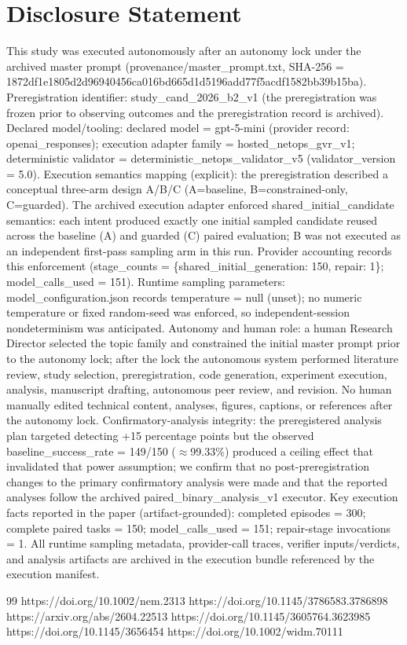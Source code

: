 \documentclass[conference]{IEEEtran}
\begin{document}
\section*{Disclosure Statement}
This study was executed autonomously after an autonomy lock under the archived master prompt (provenance/master\_prompt.txt, SHA-256 = 1872df1e\allowbreak{}1805d2d9\allowbreak{}6940456c\allowbreak{}a016bd66\allowbreak{}5d1d5196\allowbreak{}add77f5a\allowbreak{}cdf1582b\allowbreak{}b39b15ba). Preregistration identifier: study\_cand\_2026\_b2\_v1 (the preregistration was frozen prior to observing outcomes and the preregistration record is archived). Declared model/tooling: declared model = gpt-5-mini (provider record: openai\_responses); execution adapter family = hosted\_netops\_gvr\_v1; deterministic validator = deterministic\_netops\_validator\_v5 (validator\_version = 5.0). Execution semantics mapping (explicit): the preregistration described a conceptual three-arm design A/B/C (A=baseline, B=constrained-only, C=guarded). The archived execution adapter enforced shared\_initial\_candidate semantics: each intent produced exactly one initial sampled candidate reused across the baseline (A) and guarded (C) paired evaluation; B was not executed as an independent first-pass sampling arm in this run. Provider accounting records this enforcement (stage\_counts = \{shared\_initial\_generation: 150, repair: 1\}; model\_calls\_used = 151). Runtime sampling parameters: model\_configuration.json records temperature = null (unset); no numeric temperature or fixed random-seed was enforced, so independent-session nondeterminism was anticipated. Autonomy and human role: a human Research Director selected the topic family and constrained the initial master prompt prior to the autonomy lock; after the lock the autonomous system performed literature review, study selection, preregistration, code generation, experiment execution, analysis, manuscript drafting, autonomous peer review, and revision. No human manually edited technical content, analyses, figures, captions, or references after the autonomy lock. Confirmatory-analysis integrity: the preregistered analysis plan targeted detecting +15 percentage points but the observed baseline\_success\_rate = 149/150 (\ensuremath{\approx}99.33\%) produced a ceiling effect that invalidated that power assumption; we confirm that no post-preregistration changes to the primary confirmatory analysis were made and that the reported analyses follow the archived paired\_binary\_analysis\_v1 executor. Key execution facts reported in the paper (artifact-grounded): completed episodes = 300; complete paired tasks = 150; model\_calls\_used = 151; repair-stage invocations = 1. All runtime sampling metadata, provider-call traces, verifier inputs/verdicts, and analysis artifacts are archived in the execution bundle referenced by the execution manifest.

\begin{thebibliography}{99}
 https://doi.org/10.1002/nem.2313
 https://doi.org/10.1145/3786583.3786898
 https://arxiv.org/abs/2604.22513
 https://doi.org/10.1145/3605764.3623985
 https://doi.org/10.1145/3656454
 https://doi.org/10.1002/widm.70111
\end{thebibliography}
\end{document}
